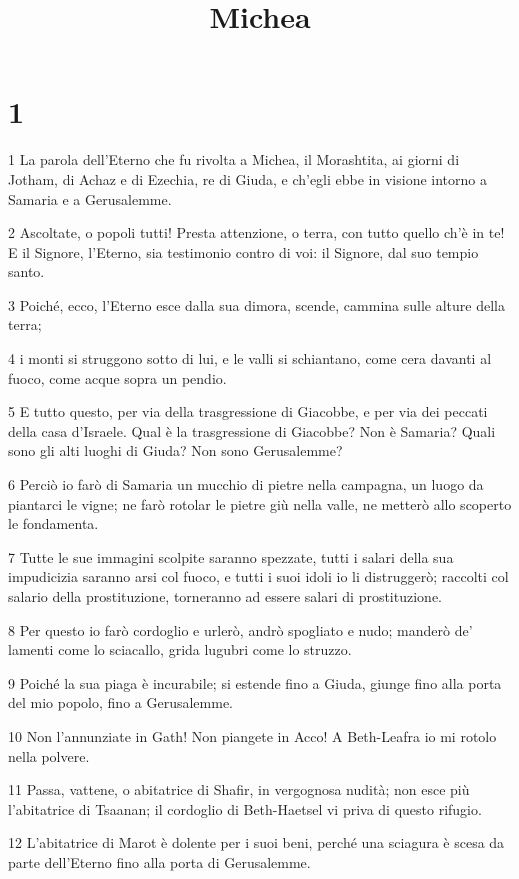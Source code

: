 

\title{Michea}


\chapter{1}

\par 1 La parola dell'Eterno che fu rivolta a Michea, il Morashtita, ai giorni di Jotham, di Achaz e di Ezechia, re di Giuda, e ch'egli ebbe in visione intorno a Samaria e a Gerusalemme.
\par 2 Ascoltate, o popoli tutti! Presta attenzione, o terra, con tutto quello ch'è in te! E il Signore, l'Eterno, sia testimonio contro di voi: il Signore, dal suo tempio santo.
\par 3 Poiché, ecco, l'Eterno esce dalla sua dimora, scende, cammina sulle alture della terra;
\par 4 i monti si struggono sotto di lui, e le valli si schiantano, come cera davanti al fuoco, come acque sopra un pendio.
\par 5 E tutto questo, per via della trasgressione di Giacobbe, e per via dei peccati della casa d'Israele. Qual è la trasgressione di Giacobbe? Non è Samaria? Quali sono gli alti luoghi di Giuda? Non sono Gerusalemme?
\par 6 Perciò io farò di Samaria un mucchio di pietre nella campagna, un luogo da piantarci le vigne; ne farò rotolar le pietre giù nella valle, ne metterò allo scoperto le fondamenta.
\par 7 Tutte le sue immagini scolpite saranno spezzate, tutti i salari della sua impudicizia saranno arsi col fuoco, e tutti i suoi idoli io li distruggerò; raccolti col salario della prostituzione, torneranno ad essere salari di prostituzione.
\par 8 Per questo io farò cordoglio e urlerò, andrò spogliato e nudo; manderò de' lamenti come lo sciacallo, grida lugubri come lo struzzo.
\par 9 Poiché la sua piaga è incurabile; si estende fino a Giuda, giunge fino alla porta del mio popolo, fino a Gerusalemme.
\par 10 Non l'annunziate in Gath! Non piangete in Acco! A Beth-Leafra io mi rotolo nella polvere.
\par 11 Passa, vattene, o abitatrice di Shafir, in vergognosa nudità; non esce più l'abitatrice di Tsaanan; il cordoglio di Beth-Haetsel vi priva di questo rifugio.
\par 12 L'abitatrice di Marot è dolente per i suoi beni, perché una sciagura è scesa da parte dell'Eterno fino alla porta di Gerusalemme.

